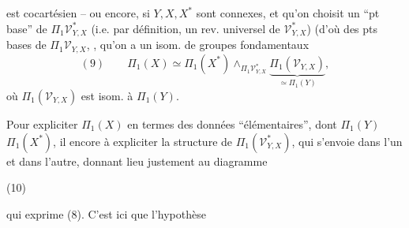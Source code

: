 
est cocartésien -- ou encore, si $Y,X,X^*$ sont connexes, et qu'on choisit un ``pt base'' de $\Pi_1\mathcal V_{Y,X}^*$ (i.e. par définition, un rev. universel de $\mathcal V_{Y,X}^*$) (d'où des pts bases de $\Pi_1\mathcal V_{Y,X}$, , qu'on a un isom.  de groupes fondamentaux
\[
(9)\qquad \Pi_1(X)\simeq\Pi_1(X^*)\wedge_{\Pi_1\mathcal V_{Y,X}^*}\underbrace{\Pi_1(\mathcal V_{Y,X})}_{\simeq\Pi_1(Y)},
\]
où $\Pi_1(\mathcal V_{Y,X})$ est isom.  à $\Pi_1(Y)$.


Pour expliciter $\Pi_1(X)$ en termes des données ``élémentaires'',  dont $\Pi_1(Y)$  $\Pi_1(X^*)$,  il  encore à expliciter la structure de $\Pi_1(\mathcal V_{Y,X}^*)$, qui s'envoie dans l'un et dans l'autre, donnant lieu justement au diagramme


(10)

qui exprime (8). C'est ici que l'hypothèse

